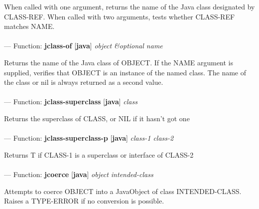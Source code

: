 \begin{adjustwidth}{5em}{5em}
When called with one argument, returns the name of the Java class
  designated by CLASS-REF. When called with two arguments, tests
  whether CLASS-REF matches NAME.
\end{adjustwidth}

\paragraph{}
\label{JAVA:JCLASS-OF}
--- Function: \textbf{jclass-of} [\textbf{java}] \textit{object \&optional name}

\begin{adjustwidth}{5em}{5em}
Returns the name of the Java class of OBJECT. If the NAME argument is
  supplied, verifies that OBJECT is an instance of the named class. The name
  of the class or nil is always returned as a second value.
\end{adjustwidth}

\paragraph{}
\label{JAVA:JCLASS-SUPERCLASS}
--- Function: \textbf{jclass-superclass} [\textbf{java}] \textit{class}

\begin{adjustwidth}{5em}{5em}
Returns the superclass of CLASS, or NIL if it hasn't got one
\end{adjustwidth}

\paragraph{}
\label{JAVA:JCLASS-SUPERCLASS-P}
--- Function: \textbf{jclass-superclass-p} [\textbf{java}] \textit{class-1 class-2}

\begin{adjustwidth}{5em}{5em}
Returns T if CLASS-1 is a superclass or interface of CLASS-2
\end{adjustwidth}

\paragraph{}
\label{JAVA:JCOERCE}
--- Function: \textbf{jcoerce} [\textbf{java}] \textit{object intended-class}

\begin{adjustwidth}{5em}{5em}
Attempts to coerce OBJECT into a JavaObject of class INTENDED-CLASS.  Raises a TYPE-ERROR if no conversion is possible.
\end{adjustwidth}

